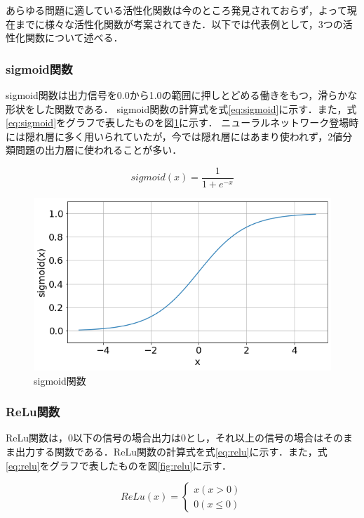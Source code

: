 \documentclass[a4j, 11pt]{jreport}
\begin{document}
あらゆる問題に適している活性化関数は今のところ発見されておらず，よって現在までに様々な活性化関数が考案されてきた．以下では代表例として，3つの活性化関数について述べる．
\subsubsection{sigmoid関数}
sigmoid関数は出力信号を0.0から1.0の範囲に押しとどめる働きをもつ，滑らかな形状をした関数である．
sigmoid関数の計算式を式\ref{eq:sigmoid}に示す．また，式\ref{eq:sigmoid}をグラフで表したものを図\ref{fig:sigmoid}に示す．
ニューラルネットワーク登場時には隠れ層に多く用いられていたが，今では隠れ層にはあまり使われず，2値分類問題の出力層に使われることが多い．

\begin{equation}
 sigmoid(x) = \frac{1}{1 + e^{-x}}
 \label{eq:sigmoid}
\end{equation}

\begin{figure}[H]
 \centering
 \includegraphics[width=0.7\hsize, keepaspectratio]{images/sigmoid.png}
 \caption{sigmoid関数}
 \label{fig:sigmoid}
\end{figure}

\subsubsection{ReLu関数}
ReLu関数\cite{Glorot2011}は，0以下の信号の場合出力は0とし，それ以上の信号の場合はそのまま出力する関数である．ReLu関数の計算式を式\ref{eq:relu}に示す．また，式\ref{eq:relu}をグラフで表したものを図\ref{fig:relu}に示す．

\begin{equation}
  ReLu(x)= \left \{
  \begin{array}{l}
  x　(x > 0)\\
  0　(x \leq 0)
  \end{array}
  \right.
  \label{eq:relu}
  \end{equation}
\end{document}
